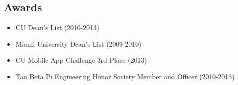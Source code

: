 \documentclass[margin]{res}
\begin{document}
\begin{resume}
\section{Awards}
  \begin{itemize} \itemsep -12pt \setlength{\itemindent}{-15pt}
  \item CU Dean’s List (2010-2013) \\
  \item Miami University Dean’s List (2009-2010) \\
  \item CU Mobile App Challenge 3rd Place (2013) \\
  \item Tau Beta Pi Engineering Honor Society Member and Officer (2010-2013) \\
  \end{itemize}

\end{resume} 
\end{document}
